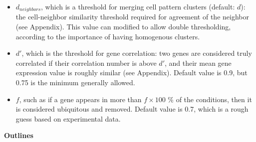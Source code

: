 \documentclass{report}
\begin{document}
\begin{itemize}
\item $d_{neighbors}$, which is a threshold for merging cell pattern clusters (default: $d$): the cell-neighbor similarity threshold required for agreement of the neighbor (see Appendix). This value can modified to allow double thresholding, according to the importance of having homogenous clusters.
\item $d'$, which is the threshold for gene correlation: two genes are considered truly correlated if their correlation number is above $d'$, and their mean gene expression value is roughly similar (see Appendix). Default value is 0.9, but 0.75 is the minimum generally allowed\cite{featureselectioncaret}.
\item $f$, such as if a gene appears in more than $f \times 100$ \% of the conditions, then it is considered ubiquitous and removed. Default value is 0.7, which is a rough guess based on experimental data.
\end{itemize}

\bigskip
\noindent \textbf{Outlines}
\bigskip
\end{document}
